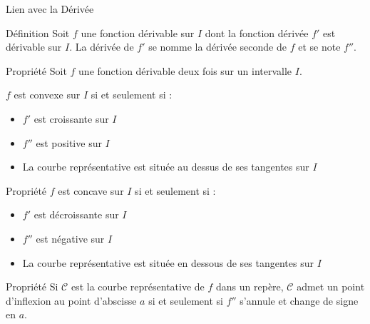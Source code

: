 \documentclass{coursbook}
\begin{document}
    \begin{Gpartie}{Lien avec la Dérivée} 
        \begin{Spartie}{Définition} 
            Soit $f$ une fonction dérivable sur $I$ dont la fonction dérivée $f'$ est dérivable sur $I$. La dérivée de $f'$ se nomme la dérivée seconde de $f$ et se note $f''$.
        \end{Spartie}
        \begin{Spartie}{Propriété} 
            Soit $f$ une fonction dérivable deux fois sur un intervalle $I$.

            $f$ est convexe sur $I$ si et seulement si :
            \begin{itemize}
                \item $f'$ est croissante sur $I$
                \item $f''$ est positive sur $I$
                \item La courbe représentative est située au dessus de ses tangentes sur $I$
            \end{itemize}
        \end{Spartie}
        \begin{Spartie}{Propriété} 
            $f$ est concave sur $I$ si et seulement si :
            \begin{itemize}
                \item $f'$ est décroissante sur $I$
                \item $f''$ est négative sur $I$
                \item La courbe représentative est située en dessous de ses tangentes sur $I$
            \end{itemize}
        \end{Spartie}
        \begin{Spartie}{Propriété} 
            Si $\mathcal{C}$ est la courbe représentative de $f$ dans un repère, $\mathcal{C}$ admet un point d'inflexion au point d'abscisse $a$ si et seulement si $f''$ s'annule et change de signe en $a$.


\end{Spartie}
\end{Gpartie}
\end{document}
